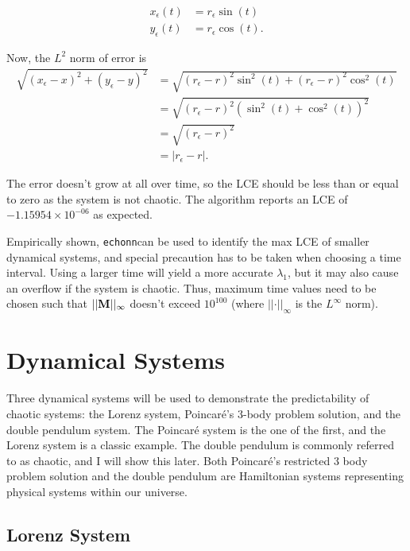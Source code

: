 \documentclass{article}
\newcommand{\echonn}{\texttt{echonn}}
\begin{document}
\begin{align*}
    x_\epsilon(t) &= r_\epsilon\sin(t) \\
    y_\epsilon(t) &= r_\epsilon\cos(t).
\end{align*}

Now, the $L^2$ norm of error is 
\begin{align*}
    \sqrt{(x_\epsilon - x)^2 + (y_\epsilon - y)^2} &= \sqrt{(r_\epsilon - r)^2\sin^2(t) + (r_\epsilon - r)^2\cos^2(t)} \\
    &= \sqrt{(r_\epsilon - r)^2(\sin^2(t) + \cos^2(t))^2} \\
    &= \sqrt{(r_\epsilon - r)^2} \\
    &= \vert r_\epsilon - r \vert.
\end{align*}

The error doesn't grow at all over time, so the LCE should be less than or equal to zero as the system is not chaotic. The algorithm reports an LCE of $-1.15954 \times 10^{-06}$ as expected.

Empirically shown, \echonn can be used to identify the max LCE of smaller 
dynamical systems, and special precaution has to be taken when choosing a 
time interval. Using a larger time will yield a more accurate $\lambda_1$, but 
it may also cause an overflow if the system is chaotic. Thus, 
maximum time values need to be chosen such that $\vert \vert \mathbf{M}\vert 
\vert_{\infty}$ doesn't exceed $10^{100}$ (where $\vert \vert \cdot \vert 
\vert_{\infty}$ is the $L^\infty$ norm).

\section{Dynamical Systems}

Three dynamical systems will be used to demonstrate the predictability of
chaotic systems: the Lorenz system, Poincaré's 3-body problem solution, and
the double pendulum system. The Poincaré system is the one of the first, and
the Lorenz system is a classic example. The double pendulum is commonly
referred to as chaotic, and I will show this later. Both Poincaré's
restricted 3 body problem solution and the double pendulum are Hamiltonian
systems representing physical systems within our universe.



\subsection{Lorenz System}
\label{sec:lorenz}
\end{document}
